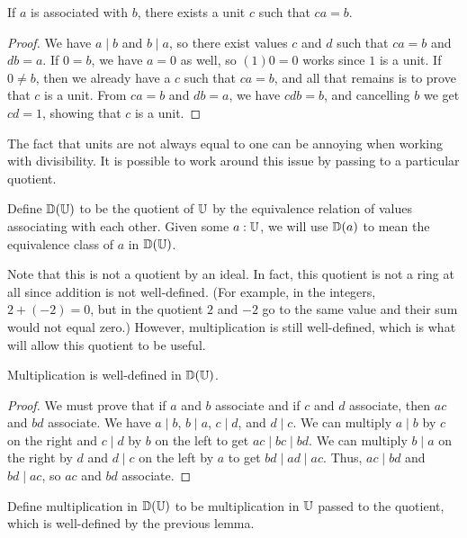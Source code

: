 \documentclass[../../math.tex]{subfiles}
\begin{document}
\begin{theorem} \label{associates_unit}
    If $a$ is associated with $b$, there exists a unit $c$ such that $ca = b$.
\end{theorem}
\begin{proof}
    We have $a \mid b$ and $b \mid a$, so there exist values $c$ and $d$ such
    that $ca = b$ and $db = a$.  If $0 = b$, we have $a = 0$ as well, so $(1)0 =
    0$ works since $1$ is a unit.  If $0 \neq b$, then we already have a $c$
    such that $ca = b$, and all that remains is to prove that $c$ is a unit.
    From $ca = b$ and $db = a$, we have $cdb = b$, and cancelling $b$ we get $cd
    = 1$, showing that $c$ is a unit.
\end{proof}

The fact that units are not always equal to one can be annoying when working
with divisibility.  It is possible to work around this issue by passing to a
particular quotient.

\begin{definition}
    Define $\mathbb{D}(\mathbb{U})$ to be the quotient of $\mathbb{U}$ by the equivalence relation of
    values associating with each other.  Given some $a : \mathbb{U}$, we will use
    $\mathbb{D}(a)$ to mean the equivalence class of $a$ in $\mathbb{D}(\mathbb{U})$.
\end{definition}

Note that this is not a quotient by an ideal.  In fact, this quotient is not a
ring at all since addition is not well-defined.  (For example, in the integers,
$2 + (-2) = 0$, but in the quotient $2$ and $-2$ go to the same value and their
sum would not equal zero.)  However, multiplication is still well-defined, which
is what will allow this quotient to be useful.

\begin{lemma}
    Multiplication is well-defined in $\mathbb{D}(\mathbb{U})$.
\end{lemma}
\begin{proof}
    We must prove that if $a$ and $b$ associate and if $c$ and $d$ associate,
    then $ac$ and $bd$ associate.  We have $a \mid b$, $b \mid a$, $c \mid d$,
    and $d \mid c$.  We can multiply $a \mid b$ by $c$ on the right and $c \mid
    d$ by $b$ on the left to get $ac \mid bc \mid bd$.  We can multiply $b \mid
    a$ on the right by $d$ and $d \mid c$ on the left by $a$ to get $bd \mid ad
    \mid ac$.  Thus, $ac \mid bd$ and $bd \mid ac$, so $ac$ and $bd$ associate.
\end{proof}

\begin{instance}
    Define multiplication in $\mathbb{D}(\mathbb{U})$ to be multiplication in $\mathbb{U}$ passed to the
    quotient, which is well-defined by the previous lemma.
\end{instance}
\end{document}
